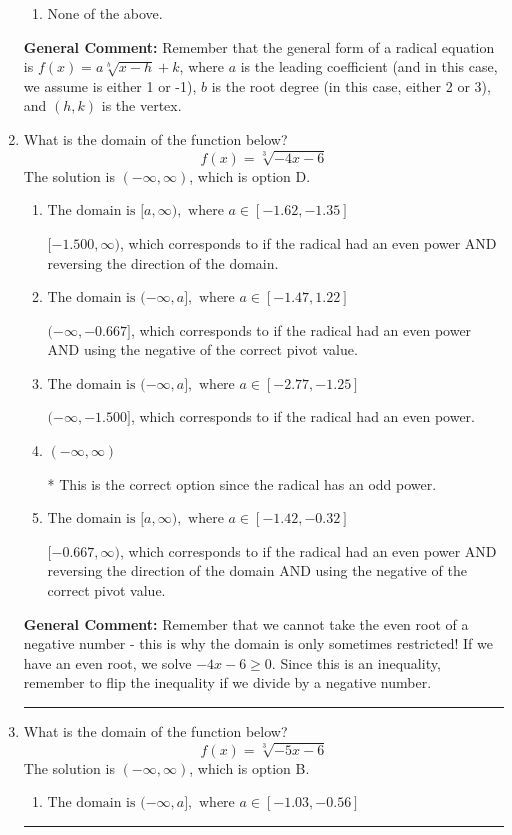 \documentclass{extbook}[14pt]
\newcommand{\litem}[1]{\item #1

\rule{\textwidth}{0.4pt}}
\begin{document}
\begin{enumerate}
{\begin{enumerate}[label=\Alph*.]
\item None of the above.\end{enumerate}
\textbf{General Comment:} Remember that the general form of a radical equation is $ f(x) = a \sqrt[b]{x - h} + k $, where $a$ is the leading coefficient (and in this case, we assume is either 1 or -1), $b$ is the root degree (in this case, either 2 or 3), and $(h, k)$ is the vertex.
}
\litem{
What is the domain of the function below?
\[ f(x) = \sqrt[3]{-4 x - 6} \]The solution is \( (-\infty, \infty) \), which is option D.\begin{enumerate}[label=\Alph*.]
\item \( \text{The domain is } [a, \infty), \text{   where } a \in [-1.62, -1.35] \)

$[-1.500, \infty)$, which corresponds to if the radical had an even power AND reversing the direction of the domain.
\item \( \text{The domain is } (-\infty, a], \text{   where } a \in [-1.47, 1.22] \)

$(-\infty, -0.667]$, which corresponds to if the radical had an even power AND using the negative of the correct pivot value.
\item \( \text{The domain is } (-\infty, a], \text{   where } a \in [-2.77, -1.25] \)

$(-\infty, -1.500]$, which corresponds to if the radical had an even power.
\item \( (-\infty, \infty) \)

* This is the correct option since the radical has an odd power.
\item \( \text{The domain is } [a, \infty), \text{   where } a \in [-1.42, -0.32] \)

$[-0.667, \infty)$, which corresponds to if the radical had an even power AND reversing the direction of the domain AND using the negative of the correct pivot value.
\end{enumerate}

\textbf{General Comment:} Remember that we cannot take the even root of a negative number - this is why the domain is only sometimes restricted! If we have an even root, we solve $-4 x - 6 \geq 0$. Since this is an inequality, remember to flip the inequality if we divide by a negative number.
}
\litem{
What is the domain of the function below?
\[ f(x) = \sqrt[3]{-5 x - 6} \]The solution is \( (-\infty, \infty) \), which is option B.\begin{enumerate}[label=\Alph*.]
\item \( \text{The domain is } (-\infty, a], \text{   where } a \in [-1.03, -0.56] \)


\end{enumerate}}
\end{enumerate}
\end{document}
